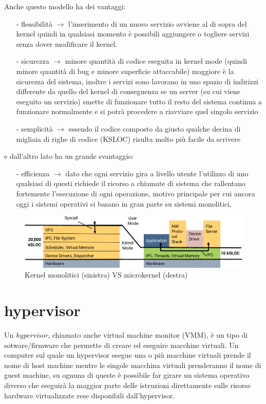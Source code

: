 Anche questo modello ha dei vantaggi:
\begin{itemize}
	\item[-] flessibilità $\rightarrow$ l'inserimento di un nuovo servizio avviene al di sopra del kernel quindi in qualsiasi momento è possibili aggiungere o togliere servizi senza dover modificare il kernel.
	\item[-] sicurezza $\rightarrow$ minore quantità di codice eseguita in kernel mode (quindi minore quantità di bug e minore superficie attaccabile) maggiore è la sicurezza del sistema, inoltre i servizi sono lavorano in uno spazio di indirizzi differente da quello del kernel di conseguenza se un server (su cui viene eseguito un servizio) smette di funzionare tutto il resto del sistema continua a funzionare normalmente e si potrà procedere a riavviare quel singolo servizio
	\item[-] semplicità $\rightarrow$ essendo il codice composto da giusto qualche decina di migliaia di righe di codice (KSLOC) risulta molto più facile da scrivere
\end{itemize}
e dall'altro lato ha un grande svantaggio:
\begin{itemize}
	\item[-] efficienza $\rightarrow$ dato che ogni servizio gira a livello utente l'utilizzo di uno qualsiasi di questi richiede il ricorso a chiamate di sistema che rallentano fortemente l'esecuzione di ogni operazione, motivo principale per cui ancora oggi i sistemi operativi si basano in gran parte su sistemi monolitici.
\end{itemize}

\begin{figure}[h]
  \includegraphics[width=\linewidth]{img/MonolithicVSmicrokernel.png}
  \caption{Kernel monolitici (sinistra) VS microkernel (destra)}
  \label{fig:MonolithicVSmicrokernel}
\end{figure}
\newpage
\section{hypervisor}
Un \textit{hypervisor}, chiamato anche virtual machine monitor (VMM), è un tipo di sotware/firmware che permette di creare ed eseguire macchine virtuali. Un computer sul quale un hypervisor esegue una o più macchine virtuali prende il nome di host machine mentre le singole macchina virtuali prenderanno il nome di guest machine, su ognuna di queste è possibile far girare un sistema operativo diverso che eseguirà la maggior parte delle istruzioni direttamente sulle risorse hardware virtualizzate rese disponibili dall'hypervisor.